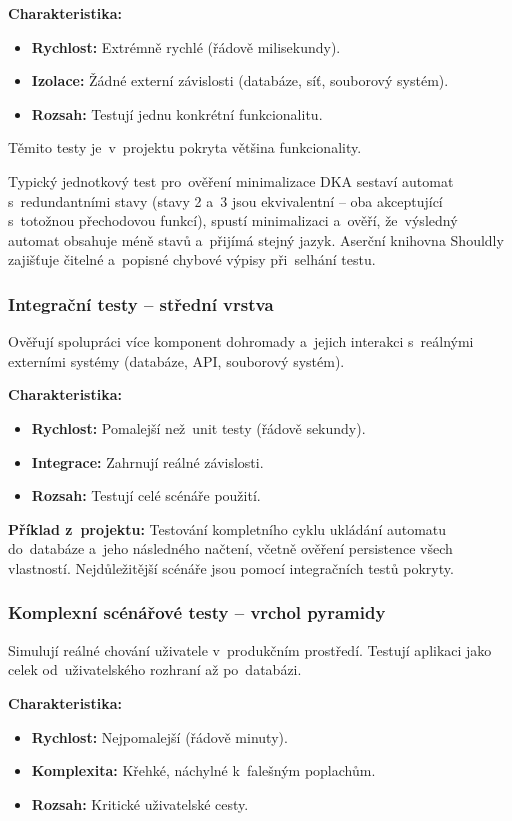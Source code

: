 \documentclass[
  master,
  program=ainfvs,
  printversion,
  figures=false,
  tables=false,
  glossaries,
  index
]{kidiplom}
\begin{document}
\textbf{Charakteristika:}
\begin{itemize}
    \item \textbf{Rychlost:} Extrémně rychlé (řádově milisekundy).
    \item \textbf{Izolace:} Žádné externí závislosti (databáze, síť, souborový systém).
    \item \textbf{Rozsah:} Testují jednu konkrétní funkcionalitu.
\end{itemize}

Těmito testy je~v~projektu pokryta většina funkcionality.

Typický jednotkový test pro~ověření minimalizace \gls{DKA} sestaví automat s~redundantními stavy (stavy 2 a~3 jsou ekvivalentní -- oba akceptující s~totožnou přechodovou funkcí), spustí minimalizaci a~ověří, že~výsledný automat obsahuje méně stavů a~přijímá stejný jazyk. Aserční knihovna Shouldly zajišťuje čitelné a~popisné chybové výpisy při~selhání testu.

\subsubsection{Integrační testy -- střední vrstva}
Ověřují spolupráci více komponent dohromady a~jejich interakci s~reálnými externími systémy (databáze, API, souborový systém).

\textbf{Charakteristika:}
\begin{itemize}
    \item \textbf{Rychlost:} Pomalejší než~unit testy (řádově sekundy).
    \item \textbf{Integrace:} Zahrnují reálné závislosti.
    \item \textbf{Rozsah:} Testují celé scénáře použití.
\end{itemize}

\textbf{Příklad z~projektu:} Testování kompletního cyklu ukládání automatu do~databáze a~jeho následného načtení, včetně ověření persistence všech vlastností. Nejdůležitější scénáře jsou pomocí integračních testů pokryty.

\subsubsection{Komplexní scénářové testy -- vrchol pyramidy}
Simulují reálné chování uživatele v~produkčním prostředí. Testují aplikaci jako celek od~uživatelského rozhraní až po~databázi.

\textbf{Charakteristika:}
\begin{itemize}
    \item \textbf{Rychlost:} Nejpomalejší (řádově minuty).
    \item \textbf{Komplexita:} Křehké, náchylné k~falešným poplachům.
    \item \textbf{Rozsah:} Kritické uživatelské cesty.
\end{itemize}
\end{document}
